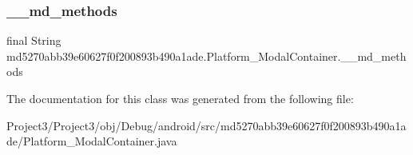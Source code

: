 \subsubsection{\texorpdfstring{\+\_\+\+\_\+md\+\_\+methods}{\_\_md\_methods}}
{\footnotesize\ttfamily final String md5270abb39e60627f0f200893b490a1ade.\+Platform\+\_\+\+Modal\+Container.\+\_\+\+\_\+md\+\_\+methods\hspace{0.3cm}{\ttfamily [static]}}



The documentation for this class was generated from the following file\+:\begin{DoxyCompactItemize}
\item 
Project3/\+Project3/obj/\+Debug/android/src/md5270abb39e60627f0f200893b490a1ade/Platform\+\_\+\+Modal\+Container.\+java\end{DoxyCompactItemize}
